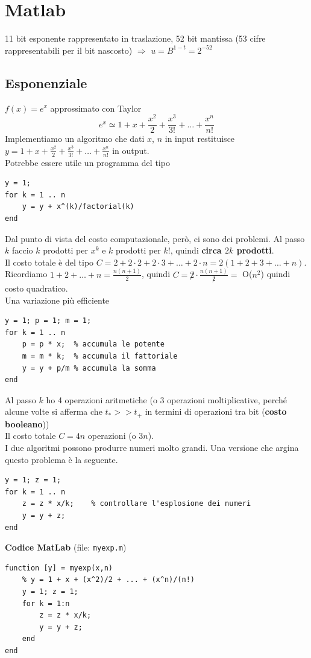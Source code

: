\documentclass[10pt]{book}
\begin{document}
\pagebreak
\chapter{Matlab}
11 bit esponente rappresentato in traslazione, 52 bit mantissa (53 cifre rappresentabili per il bit nascosto) $\Rightarrow$ $u = B^{1-t} = 2^{-52}$
\section{Esponenziale}
$f(x) = e^x$ approssimato con Taylor $$e^x \simeq 1 + x + \frac{x^2}{2} + \frac{x^3}{3!} + \ldots + \frac{x^n}{n!}$$ Implementiamo un algoritmo che dati $x$, $n$ in input restituisce $y = 1 + x + \frac{x^2}{2} + \frac{x^3}{3!} + \ldots + \frac{x^n}{n!}$ in output.\\
Potrebbe essere utile un programma del tipo
\begin{lstlisting}
y = 1;
for k = 1 .. n
	y = y + x^(k)/factorial(k)
end
\end{lstlisting}
Dal punto di vista del costo computazionale, però, ci sono dei problemi. Al passo $k$ faccio $k$ prodotti per $x^k$ e $k$ prodotti per $k!$, quindi \textbf{circa $2k$ prodotti}.\\
Il costo totale è del tipo $C = 2 + 2\cdot 2 + 2\cdot 3 + \ldots + 2\cdot n = 2(1 + 2 + 3 + \ldots + n)$.\\
Ricordiamo $1 + 2 + \ldots + n = \frac{n(n + 1)}{2}$, quindi $C = \not 2\cdot\frac{n(n+1)}{\not 2} =$ O($n^2$) quindi costo quadratico.\\
Una variazione più efficiente
\begin{lstlisting}
y = 1; p = 1; m = 1;
for k = 1 .. n
	p = p * x;	% accumula le potente
	m = m * k;	% accumula il fattoriale
	y = y + p/m	% accumula la somma
end
\end{lstlisting}
Al passo $k$ ho 4 operazioni aritmetiche (o 3 operazioni moltiplicative, perché alcune volte si afferma che $t_* >> t_+$ in termini di operazioni tra bit (\textbf{costo booleano}))\\
Il costo totale $C = 4n$ operazioni (o $3n$).\\
I due algoritmi possono produrre numeri molto grandi. Una versione che argina questo problema è la seguente.
\begin{lstlisting}
y = 1; z = 1;
for k = 1 .. n
	z = z * x/k;	% controllare l'esplosione dei numeri
	y = y + z;
end
\end{lstlisting}
\begin{center}
\pagebreak
\textbf{Codice MatLab} (file: \texttt{myexp.m})
\begin{lstlisting}
function [y] = myexp(x,n)
    % y = 1 + x + (x^2)/2 + ... + (x^n)/(n!)
    y = 1; z = 1;
    for k = 1:n
        z = z * x/k;
        y = y + z;
    end
end
\end{lstlisting}
\end{center}
\end{document}
